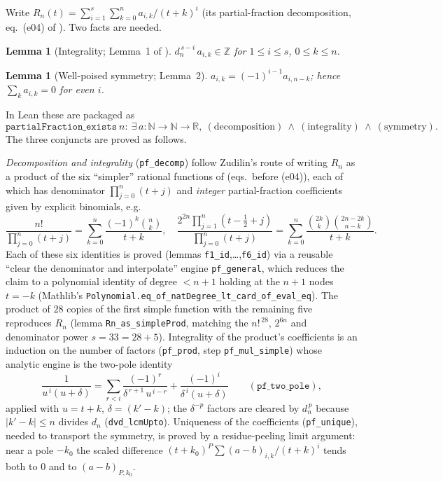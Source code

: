\documentclass[11pt]{article}
\newtheorem{lemma}[theorem]{Lemma}
\theoremstyle{definition}
\newcommand{\Z}{\mathbb{Z}}
\newcommand{\R}{\mathbb{R}}
\newcommand{\N}{\mathbb{N}}
\newcommand{\code}[1]{\texttt{#1}}
\newcommand{\Rn}{R_n}
\begin{document}
Write $\Rn(t)=\sum_{i=1}^{s}\sum_{k=0}^{n}a_{i,k}/(t+k)^i$ (its partial-fraction
decomposition, eq.~(e04) of \cite{Zudilin2018}). Two facts are needed.

\begin{lemma}[Integrality; Lemma~1 of \cite{Zudilin2018}]\label{lem:int}
$d_n^{\,s-i}\,a_{i,k}\in\Z$ for $1\le i\le s$, $0\le k\le n$.
\end{lemma}

\begin{lemma}[Well-poised symmetry; Lemma~2]\label{lem:sym}
$a_{i,k}=(-1)^{i-1}a_{i,n-k}$; hence $\sum_k a_{i,k}=0$ for even $i$.
\end{lemma}

In Lean these are packaged as
\[
  \code{partialFraction\_exists}\ n :\ \exists\, a:\N\to\N\to\R,\
  (\text{decomposition})\ \wedge\ (\text{integrality})\ \wedge\ (\text{symmetry}).
\]
The three conjuncts are proved as follows.

\emph{Decomposition and integrality} (\code{pf\_decomp}) follow Zudilin's route
of writing $\Rn$ as a product of the six ``simpler'' rational functions of
\cite{Zudilin2018} (eqs.\ before (e04)), each of which has denominator
$\prod_{j=0}^n(t+j)$ and \emph{integer} partial-fraction coefficients given by
explicit binomials, e.g.
\[
  \frac{n!}{\prod_{j=0}^n(t+j)}=\sum_{k=0}^n\frac{(-1)^k\binom nk}{t+k},
  \quad
  \frac{2^{2n}\prod_{j=1}^n(t-\tfrac12+j)}{\prod_{j=0}^n(t+j)}
   =\sum_{k=0}^n\frac{\binom{2k}{k}\binom{2n-2k}{n-k}}{t+k}.
\]
Each of these six identities is proved (lemmas \code{f1\_id},\dots,\code{f6\_id})
via a reusable ``clear the denominator and interpolate'' engine
\code{pf\_general}, which reduces the claim to a polynomial identity of degree
$<n+1$ holding at the $n+1$ nodes $t=-k$ (Mathlib's
\code{Polynomial.eq\_of\_natDegree\_lt\_card\_of\_eval\_eq}). The product of
$28$ copies of the first simple function with the remaining five reproduces
$\Rn$ (lemma \code{Rn\_as\_simpleProd}, matching the $n!^{\,28}$, $2^{6n}$ and
denominator power $s=33=28+5$). Integrality of the product's coefficients is an
induction on the number of factors (\code{pf\_prod}, step \code{pf\_mul\_simple})
whose analytic engine is the two-pole identity
\[
  \frac{1}{u^{\,i}(u+\delta)}
    =\sum_{r<i}\frac{(-1)^r}{\delta^{\,r+1}\,u^{\,i-r}}
     +\frac{(-1)^i}{\delta^{\,i}(u+\delta)}
  \qquad(\code{pf\_two\_pole}),
\]
applied with $u=t+k$, $\delta=(k'-k)$; the $\delta^{-p}$ factors are cleared by
$d_n^{\,p}$ because $|k'-k|\le n$ divides $d_n$
(\code{dvd\_lcmUpto}). Uniqueness of the coefficients (\code{pf\_unique}),
needed to transport the symmetry, is proved by a residue-peeling limit
argument: near a pole $-k_0$ the scaled difference
$(t+k_0)^{P}\sum(a-b)_{i,k}/(t+k)^i$ tends both to $0$ and to
$(a-b)_{P,k_0}$.
\end{document}
